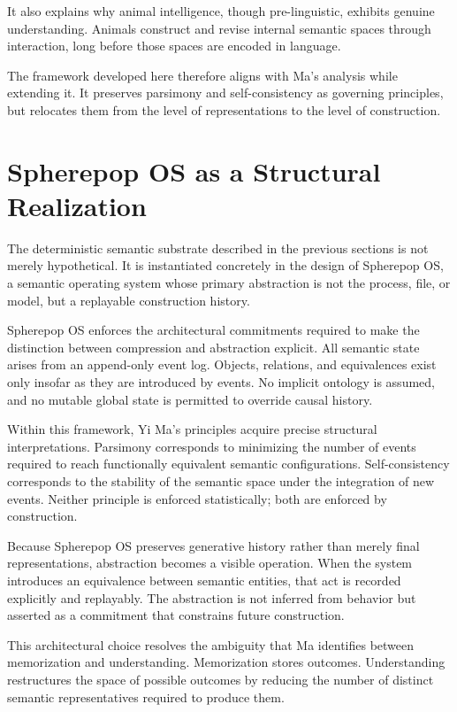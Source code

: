 \documentclass[11pt]{article}
\begin{document}
It also explains why animal intelligence, though pre-linguistic, exhibits
genuine understanding. Animals construct and revise internal semantic
spaces through interaction, long before those spaces are encoded in
language.

The framework developed here therefore aligns with Ma’s analysis while
extending it. It preserves parsimony and self-consistency as governing
principles, but relocates them from the level of representations to the
level of construction.

\section{Spherepop OS as a Structural Realization}

The deterministic semantic substrate described in the previous sections is
not merely hypothetical. It is instantiated concretely in the design of
Spherepop OS, a semantic operating system whose primary abstraction is not
the process, file, or model, but a replayable construction history.

Spherepop OS enforces the architectural commitments required to make the
distinction between compression and abstraction explicit. All semantic
state arises from an append-only event log. Objects, relations, and
equivalences exist only insofar as they are introduced by events. No
implicit ontology is assumed, and no mutable global state is permitted to
override causal history.

Within this framework, Yi Ma’s principles acquire precise structural
interpretations. Parsimony corresponds to minimizing the number of events
required to reach functionally equivalent semantic configurations.
Self-consistency corresponds to the stability of the semantic space under
the integration of new events. Neither principle is enforced statistically;
both are enforced by construction.

Because Spherepop OS preserves generative history rather than merely final
representations, abstraction becomes a visible operation. When the system
introduces an equivalence between semantic entities, that act is recorded
explicitly and replayably. The abstraction is not inferred from behavior
but asserted as a commitment that constrains future construction.

This architectural choice resolves the ambiguity that Ma identifies
between memorization and understanding. Memorization stores outcomes.
Understanding restructures the space of possible outcomes by reducing the
number of distinct semantic representatives required to produce them.
\end{document}
